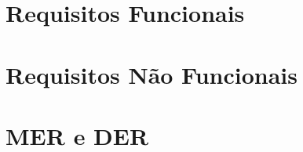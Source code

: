 \documentclass[
    12pt,               %
    openright,          %
    oneside,
    a4paper,            %
    english,            %
    brazil              %
   ]{ifsp-spo-inf-ctds}
\begin{document}
\section{Requisitos Funcionais}
\section{Requisitos Não Funcionais}
\section{MER e DER}





\end{document}
